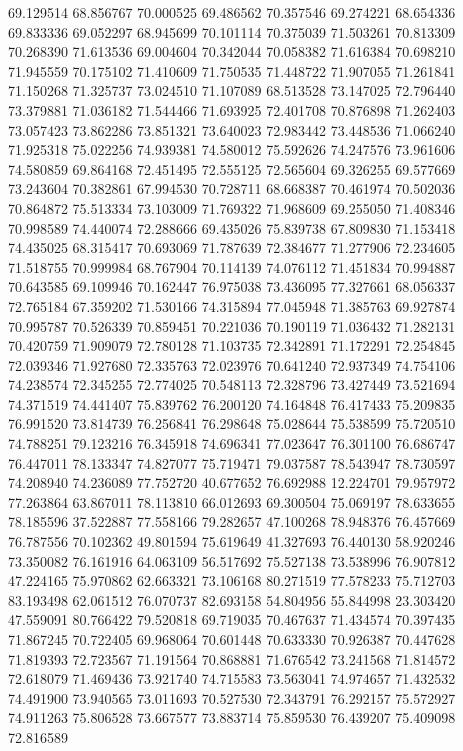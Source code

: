 69.129514
68.856767
70.000525
69.486562
70.357546
69.274221
68.654336
69.833336
69.052297
68.945699
70.101114
70.375039
71.503261
70.813309
70.268390
71.613536
69.004604
70.342044
70.058382
71.616384
70.698210
71.945559
70.175102
71.410609
71.750535
71.448722
71.907055
71.261841
71.150268
71.325737
73.024510
71.107089
68.513528
73.147025
72.796440
73.379881
71.036182
71.544466
71.693925
72.401708
70.876898
71.262403
73.057423
73.862286
73.851321
73.640023
72.983442
73.448536
71.066240
71.925318
75.022256
74.939381
74.580012
75.592626
74.247576
73.961606
74.580859
69.864168
72.451495
72.555125
72.565604
69.326255
69.577669
73.243604
70.382861
67.994530
70.728711
68.668387
70.461974
70.502036
70.864872
75.513334
73.103009
71.769322
71.968609
69.255050
71.408346
70.998589
74.440074
72.288666
69.435026
75.839738
67.809830
71.153418
74.435025
68.315417
70.693069
71.787639
72.384677
71.277906
72.234605
71.518755
70.999984
68.767904
70.114139
74.076112
71.451834
70.994887
70.643585
69.109946
70.162447
76.975038
73.436095
77.327661
68.056337
72.765184
67.359202
71.530166
74.315894
77.045948
71.385763
69.927874
70.995787
70.526339
70.859451
70.221036
70.190119
71.036432
71.282131
70.420759
71.909079
72.780128
71.103735
72.342891
71.172291
72.254845
72.039346
71.927680
72.335763
72.023976
70.641240
72.937349
74.754106
74.238574
72.345255
72.774025
70.548113
72.328796
73.427449
73.521694
74.371519
74.441407
75.839762
76.200120
74.164848
76.417433
75.209835
76.991520
73.814739
76.256841
76.298648
75.028644
75.538599
75.720510
74.788251
79.123216
76.345918
74.696341
77.023647
76.301100
76.686747
76.447011
78.133347
74.827077
75.719471
79.037587
78.543947
78.730597
74.208940
74.236089
77.752720
40.677652
76.692988
12.224701
79.957972
77.263864
63.867011
78.113810
66.012693
69.300504
75.069197
78.633655
78.185596
37.522887
77.558166
79.282657
47.100268
78.948376
76.457669
76.787556
70.102362
49.801594
75.619649
41.327693
76.440130
58.920246
73.350082
76.161916
64.063109
56.517692
75.527138
73.538996
76.907812
47.224165
75.970862
62.663321
73.106168
80.271519
77.578233
75.712703
83.193498
62.061512
76.070737
82.693158
54.804956
55.844998
23.303420
47.559091
80.766422
79.520818
69.719035
70.467637
71.434574
70.397435
71.867245
70.722405
69.968064
70.601448
70.633330
70.926387
70.447628
71.819393
72.723567
71.191564
70.868881
71.676542
73.241568
71.814572
72.618079
71.469436
73.921740
74.715583
73.563041
74.974657
71.432532
74.491900
73.940565
73.011693
70.527530
72.343791
76.292157
75.572927
74.911263
75.806528
73.667577
73.883714
75.859530
76.439207
75.409098
72.816589
